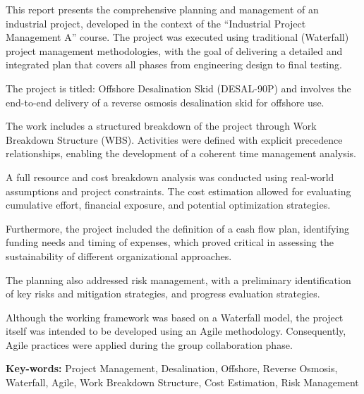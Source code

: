 \vspace{4pt}
{\normalsize
This report presents the comprehensive planning and management of an industrial project, developed in the context of the “Industrial Project Management A” course. The project was executed using traditional (Waterfall) project management methodologies, with the goal of delivering a detailed and integrated plan that covers all phases from engineering design to final testing.

The project is titled: Offshore Desalination Skid (DESAL-90P) and involves the end-to-end delivery of a reverse osmosis desalination skid for offshore use.

The work includes a structured breakdown of the project through Work Breakdown Structure (WBS). Activities were defined with explicit precedence relationships, enabling the development of a coherent time management analysis.

A full resource and cost breakdown analysis was conducted using real-world assumptions and project constraints. The cost estimation allowed for evaluating cumulative effort, financial exposure, and potential optimization strategies.

Furthermore, the project included the definition of a cash flow plan, identifying funding needs and timing of expenses, which proved critical in assessing the sustainability of different organizational approaches.

The planning also addressed risk management, with a preliminary identification of key risks and mitigation strategies, and progress evaluation strategies.

Although the working framework was based on a Waterfall model, the project itself was intended to be developed using an Agile methodology. Consequently, Agile practices were applied during the group collaboration phase.

}

\vspace{10pt}

\begin{tcolorbox}[arc=0pt, boxrule=0pt, colback=cherenkovblue!60, width=\textwidth, colupper=white]
    {\titlesfont\fontsize{10}{12}\textbf{Key-words:}} Project Management, Desalination, Offshore, Reverse Osmosis, Waterfall, Agile, Work Breakdown Structure, Cost Estimation, Risk Management
\end{tcolorbox}

\vspace{12pt}

